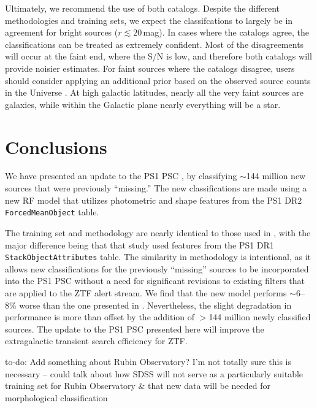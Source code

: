 \documentclass[twocolumn]{aastex63}
\newcommand{\todo}[1]{{\color{magenta} to-do: {#1}}}
\begin{document}
Ultimately, we recommend the use of both catalogs. Despite the different
methodologies and training sets, we expect the classifcations to largely be in
agreement for bright sources ($r \lesssim 20$\,mag). In cases where the
catalogs agree, the classifications can be treated as extremely confident.
Most of the disagreements will occur at the faint end, where the S/N is low,
and therefore both catalogs will provide noisier estimates. For faint sources
where the catalogs disagree, users should consider applying an additional
prior based on the observed source counts in the Universe
\citep[e.g.][]{Yasuda01}. At high galactic latitudes, nearly all the very
faint sources are galaxies, while within the Galactic plane nearly everything
will be a star.

\section{Conclusions}

We have presented an update to the PS1 PSC \citep{Tachibana18}, by classifying
$\sim$144 million new sources that were previously ``missing.'' The new
classifications are made using a new RF model that utilizes photometric and
shape features from the PS1 DR2 \texttt{ForcedMeanObject} table.

The training set and methodology are nearly identical to those used in
\citet{Tachibana18}, with the major difference being that that study used
features from the PS1 DR1 \texttt{StackObjectAttributes} table. The similarity
in methodology is intentional, as it allows new classifications for the
previously ``missing'' sources to be incorporated into the PS1 PSC without a
need for significant revisions to existing filters that are applied to the ZTF
alert stream. We find that the new model performs $\sim$6--8\% worse than the
one presented in \citet[][see Table~\ref{tbl:thresh}]{Tachibana18}.
Nevertheless, the slight degradation in performance is more than offset by the
addition of $>$144 million newly classified sources. The update to the PS1 PSC
presented here will improve the extragalactic transient search efficiency for
ZTF.

\todo{Add something about Rubin Observatory? I'm not totally sure this is necessary -- could talk about how SDSS will not serve as a particularly suitable training set for Rubin Observatory \& that new data will be needed for morphological classification}

\acknowledgments

\vspace{5mm}
\end{document}
